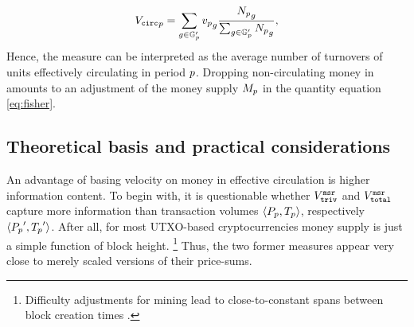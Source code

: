 \begin{align}%
  \label{eq:disentangle_vcirc}
  \VCircP %
  =  \sum_{g\in\GStrokeP} \vp_g
  \frac{\Np_g}{\sum_{g\in\GStrokeP} \Np_g },%
\end{align}%
Hence, the measure can be interpreted as the average number of turnovers of
units effectively circulating in period ${p}$. %
Dropping non-circulating money in  amounts to an
adjustment of the money supply ${M_{p}}$ in the quantity equation
\eqref{eq:fisher}.  %

\subsection{Theoretical basis and practical considerations}
An advantage of basing velocity on money in effective circulation is higher
information content. %
To begin with, it is questionable whether ${V_{\mathtt{triv}}^{\mathtt{msr}}}$ and ${V_{\mathtt{total}}^{\mathtt{msr}}}$
capture more information than transaction volumes $\langle{P_{p}},{T_{p}}\rangle$,
respectively $\langle{P_{p}}',{T_{p}}'\rangle$. %
After all, for most UTXO-based cryptocurrencies money supply is just a simple
function of block height.%
\footnote{Difficulty adjustments for mining lead to close-to-constant spans
  between block creation times \citep{tschorsch2016bitcoin}.} %
Thus, the two former measures appear very close to merely scaled versions of
their price-sums. %

